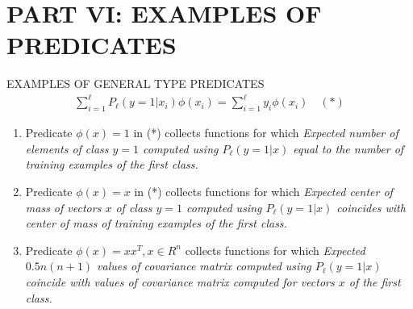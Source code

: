 \documentclass[11pt]{beamer}
\begin{document}
\section{PART VI: EXAMPLES OF PREDICATES}
\begin{frame}
{\color{blue}{
\begin{center}
PART VI
\end{center}
\begin{center}
EXAMPLES OF PREDICATES
\end{center}
}}
\end{frame}


\begin{frame}{EXAMPLES OF GENERAL TYPE PREDICATES}
\begin{align*}
\sum_{i=1}^{\ell}P_{\ell}(y=1|x_{i})\phi(x_{i}) = \sum_{i=1}^{\ell}y_{i}\phi(x_{i}) \quad (*)
\end{align*}
\hrulefill
\begin{enumerate}
\item Predicate $\phi(x) = 1$ in (*) collects functions for which \emph{Expected number of elements of class $y=1$ computed using $P_{\ell}(y=1|x)$ equal to the number of training examples of the first class.}
\item Predicate $\phi(x) = x$ in (*) collects functions for which \emph{Expected center of mass of vectors $x$ of class $y=1$ computed using $P_{\ell}(y=1|x)$ coincides with center of mass of training examples of the first class.}
\item Predicate $\phi(x) = xx^{T}, x \in R^{n}$ collects functions for which \emph{Expected $0.5n(n + 1)$ values of covariance matrix computed using $P_{\ell}(y=1|x)$ coincide with values of covariance matrix computed for vectors $x$ of the first class.}
\end{enumerate}
\end{frame}
\end{document}
